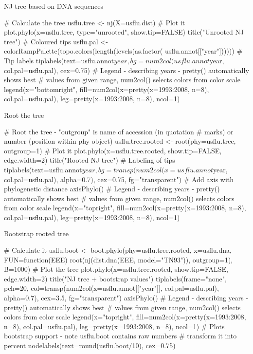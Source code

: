 \documentclass[compress, ucs, xelatex, 11pt, xcolor=svgnames,
  hyperref={
    bookmarks=true,
    unicode=true,
    colorlinks=true,
    pdftitle={Molecular data in R},
    plainpages=false,
    pdfauthor={Vojtech Zeisek},
    pdfsubject={Course about phylogeny and evolution in R},
    pdfcreator={XeLaTeX},
    pdfkeywords={R, evolution, phylogeny, molecular data},
    linkcolor=Tomato,
    anchorcolor=SaddleBrown,
    citecolor=Goldenrod,
    filecolor=DarkMagenta,
    menucolor=Sienna,
    urlcolor=DarkTurquoise,
    pdftex},
  url={hyphens, lowtilde} %
  ]{beamer}
\begin{document}
\begin{frame}[fragile]{NJ tree based on DNA sequences}
  \begin{spluscode}
    # Calculate the tree
    usflu.tree <- nj(X=usflu.dist)
    # Plot it
    plot.phylo(x=usflu.tree, type="unrooted", show.tip=FALSE)
    title("Unrooted NJ tree")
    # Coloured tips
    usflu.pal <- colorRampPalette(topo.colors(length(levels(as.factor(
      usflu.annot[["year"])))))
    # Tip labels
    tiplabels(text=usflu.annot$year, bg=num2col(usflu.annot$year,
      col.pal=usflu.pal), cex=0.75)
    # Legend - describing years - pretty() automatically shows best
    # values from given range, num2col() selects colors from color scale
    legend(x="bottomright", fill=num2col(x=pretty(x=1993:2008, n=8),
      col.pal=usflu.pal), leg=pretty(x=1993:2008, n=8), ncol=1)
  \end{spluscode}
\end{frame}

\begin{frame}[fragile]{Root the tree}
  \begin{spluscode}
    # Root the tree - "outgroup" is name of accession (in quotation
    # marks) or number (position within phy object)
    usflu.tree.rooted <- root(phy=usflu.tree, outgroup=1)
    # Plot it
    plot.phylo(x=usflu.tree.rooted, show.tip=FALSE, edge.width=2)
    title("Rooted NJ tree")
    # Labeling of tips
    tiplabels(text=usflu.annot$year, bg=transp(num2col(x=usflu.annot$year,
      col.pal=usflu.pal), alpha=0.7), cex=0.75, fg="transparent")
    # Add axis with phylogenetic distance
    axisPhylo()
    # Legend - describing years - pretty() automatically shows best
    # values from given range, num2col() selects colors from color scale
    legend(x="topright", fill=num2col(x=pretty(x=1993:2008, n=8),
      col.pal=usflu.pal), leg=pretty(x=1993:2008, n=8), ncol=1)
  \end{spluscode}
\end{frame}

\begin{frame}[fragile]{Bootstrap rooted tree}
  \begin{spluscode}
    # Calculate it
    usflu.boot <- boot.phylo(phy=usflu.tree.rooted, x=usflu.dna,
      FUN=function(EEE) root(nj(dist.dna(EEE, model="TN93")),
      outgroup=1), B=1000)
    # Plot the tree
    plot.phylo(x=usflu.tree.rooted, show.tip=FALSE, edge.width=2)
    title("NJ tree + bootstrap values")
    tiplabels(frame="none", pch=20, col=transp(num2col(x=usflu.annot[["year"]],
      col.pal=usflu.pal), alpha=0.7), cex=3.5, fg="transparent")
    axisPhylo()
    # Legend - describing years - pretty() automatically shows best
    # values from given range, num2col() selects colors from color scale
    legend(x="topright", fill=num2col(x=pretty(x=1993:2008, n=8),
      col.pal=usflu.pal), leg=pretty(x=1993:2008, n=8), ncol=1)
    # Plots bootstrap support - note usflu.boot contains raw numbers
    # transform it into percent
    nodelabels(text=round(usflu.boot/10), cex=0.75)
  \end{spluscode}
\end{frame}
\end{document}
